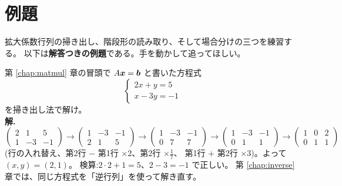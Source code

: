 \section{例題}

拡大係数行列の掃き出し、階段形の読み取り、そして場合分けの三つを練習する。
以下は\textbf{解答つきの例題}である。手を動かして追ってほしい。

\begin{rei}[例題・基本(ただ一つの解)]
第 \ref{chap:matmul} 章の冒頭で $A\bm{x} = \bm{b}$ と書いた方程式
\[
\begin{cases}
2x + y = 5 \\
x - 3y = -1
\end{cases}
\]
を掃き出し法で解け。\\
\textbf{解.}\
\[
\left(\begin{array}{cc|c}
2 & 1 & 5 \\
1 & -3 & -1
\end{array}\right)
\longrightarrow
\left(\begin{array}{cc|c}
1 & -3 & -1 \\
2 & 1 & 5
\end{array}\right)
\longrightarrow
\left(\begin{array}{cc|c}
1 & -3 & -1 \\
0 & 7 & 7
\end{array}\right)
\longrightarrow
\left(\begin{array}{cc|c}
1 & -3 & -1 \\
0 & 1 & 1
\end{array}\right)
\longrightarrow
\left(\begin{array}{cc|c}
1 & 0 & 2 \\
0 & 1 & 1
\end{array}\right)
\]
(行の入れ替え、第2行 $-$ 第1行 $\times 2$、第2行 $\times \frac{1}{7}$、
第1行 $+$ 第2行 $\times 3$)。よって $(x, y) = (2, 1)$。
検算:$2 \cdot 2 + 1 = 5$、$2 - 3 = -1$ で正しい。
第 \ref{chap:inverse} 章では、同じ方程式を「逆行列」を使って解き直す。
\end{rei}

